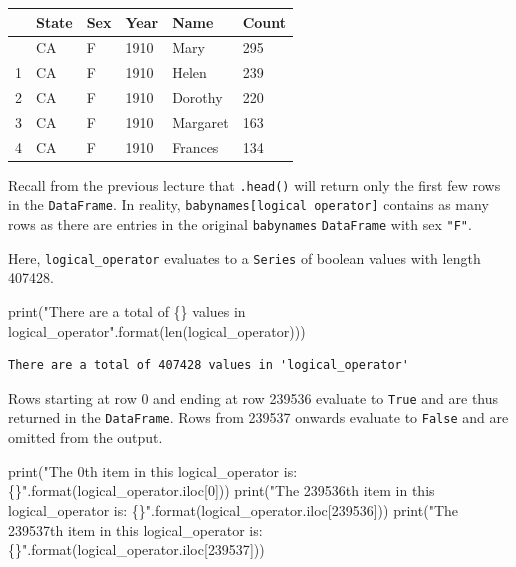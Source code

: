 \documentclass[
  letterpaper,
  DIV=11,
  numbers=noendperiod]{scrreprt}
\newenvironment{Shaded}{\begin{snugshade}}{\end{snugshade}}
\newcommand{\BuiltInTok}[1]{\textcolor[rgb]{0.00,0.23,0.31}{#1}}
\newcommand{\DecValTok}[1]{\textcolor[rgb]{0.68,0.00,0.00}{#1}}
\newcommand{\NormalTok}[1]{\textcolor[rgb]{0.00,0.23,0.31}{#1}}
\newcommand{\SpecialCharTok}[1]{\textcolor[rgb]{0.37,0.37,0.37}{#1}}
\newcommand{\StringTok}[1]{\textcolor[rgb]{0.13,0.47,0.30}{#1}}
\begin{document}
\begin{longtable}[]{@{}llllll@{}}
\toprule\noalign{}
& State & Sex & Year & Name & Count \\
\midrule\noalign{}
\endhead
\bottomrule\noalign{}
\endlastfoot
0 & CA & F & 1910 & Mary & 295 \\
1 & CA & F & 1910 & Helen & 239 \\
2 & CA & F & 1910 & Dorothy & 220 \\
3 & CA & F & 1910 & Margaret & 163 \\
4 & CA & F & 1910 & Frances & 134 \\
\end{longtable}

Recall from the previous lecture that \texttt{.head()} will return only
the first few rows in the \texttt{DataFrame}. In reality,
\texttt{babynames{[}logical\ operator{]}} contains as many rows as there
are entries in the original \texttt{babynames} \texttt{DataFrame} with
sex \texttt{"F"}.

Here, \texttt{logical\_operator} evaluates to a \texttt{Series} of
boolean values with length 407428.

\begin{Shaded}
\begin{Highlighting}[]
\BuiltInTok{print}\NormalTok{(}\StringTok{"There are a total of }\SpecialCharTok{\{\}}\StringTok{ values in \textquotesingle{}logical\_operator\textquotesingle{}"}\NormalTok{.}\BuiltInTok{format}\NormalTok{(}\BuiltInTok{len}\NormalTok{(logical\_operator)))}
\end{Highlighting}
\end{Shaded}

\begin{verbatim}
There are a total of 407428 values in 'logical_operator'
\end{verbatim}

Rows starting at row 0 and ending at row 239536 evaluate to
\texttt{True} and are thus returned in the \texttt{DataFrame}. Rows from
239537 onwards evaluate to \texttt{False} and are omitted from the
output.

\begin{Shaded}
\begin{Highlighting}[]
\BuiltInTok{print}\NormalTok{(}\StringTok{"The 0th item in this \textquotesingle{}logical\_operator\textquotesingle{} is: }\SpecialCharTok{\{\}}\StringTok{"}\NormalTok{.}\BuiltInTok{format}\NormalTok{(logical\_operator.iloc[}\DecValTok{0}\NormalTok{]))}
\BuiltInTok{print}\NormalTok{(}\StringTok{"The 239536th item in this \textquotesingle{}logical\_operator\textquotesingle{} is: }\SpecialCharTok{\{\}}\StringTok{"}\NormalTok{.}\BuiltInTok{format}\NormalTok{(logical\_operator.iloc[}\DecValTok{239536}\NormalTok{]))}
\BuiltInTok{print}\NormalTok{(}\StringTok{"The 239537th item in this \textquotesingle{}logical\_operator\textquotesingle{} is: }\SpecialCharTok{\{\}}\StringTok{"}\NormalTok{.}\BuiltInTok{format}\NormalTok{(logical\_operator.iloc[}\DecValTok{239537}\NormalTok{]))}
\end{Highlighting}
\end{Shaded}
\end{document}
